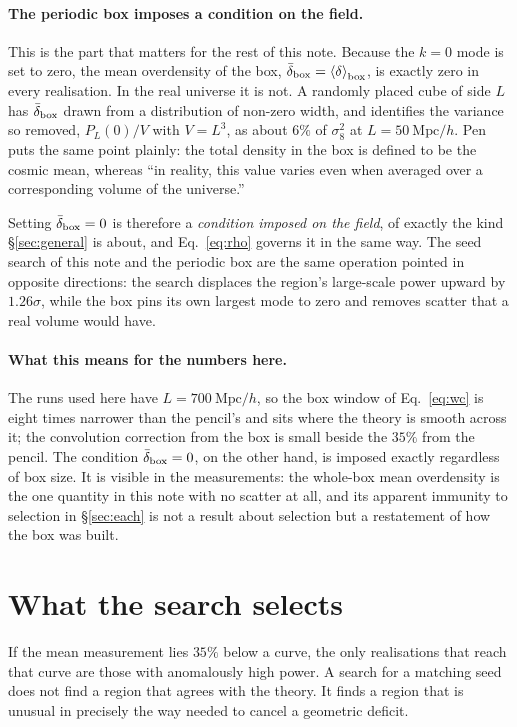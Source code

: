 \documentclass[12pt]{article}
\newcommand{\avg}[1]{\left\langle #1 \right\rangle}
\newcommand{\Mpch}{\ \mathrm{Mpc}/h}
\begin{document}
\paragraph{The periodic box imposes a condition on the field.}
This is the part that matters for the rest of this note. Because the $k = 0$
mode is set to zero, the mean overdensity of the box,
$\bar\delta_{\rm box} = \avg{\delta}_{\rm box}$, is exactly zero in every
realisation. In the real universe it is not. A randomly placed cube of side $L$
has $\bar\delta_{\rm box}$ drawn from a distribution of non-zero width, and
\citet{Sirko2005} identifies the variance so removed, $P_L(0)/V$ with
$V = L^3$, as about $6\%$ of $\sigma_8^2$ at $L = 50\Mpch$. Pen puts the same
point plainly: the total density in the box is defined to be the cosmic mean,
whereas ``in reality, this value varies even when averaged over a corresponding
volume of the universe.''

Setting $\bar\delta_{\rm box} = 0$ is therefore a \emph{condition imposed on the
field}, of exactly the kind \S\ref{sec:general} is about, and
Eq.~\eqref{eq:rho} governs it in the same way. The seed search of this note and
the periodic box are the same operation pointed in opposite directions: the
search displaces the region's large-scale power upward by $1.26\sigma$, while
the box pins its own largest mode to zero and removes scatter that a real volume
would have.

\paragraph{What this means for the numbers here.}
The runs used here have $L = 700\Mpch$, so the box window of Eq.~\eqref{eq:wc}
is eight times narrower than the pencil's and sits where the theory is smooth
across it; the convolution correction from the box is small beside the $35\%$
from the pencil. The condition $\bar\delta_{\rm box} = 0$, on the other hand, is
imposed exactly regardless of box size. It is visible in the measurements: the
whole-box mean overdensity is the one quantity in this note with no scatter at
all, and its apparent immunity to selection in \S\ref{sec:each} is not a result
about selection but a restatement of how the box was built.

\section{What the search selects}
\label{sec:selects}

If the mean measurement lies $35\%$ below a curve, the only realisations that
reach that curve are those with anomalously high power. A search for a matching
seed does not find a region that agrees with the theory. It finds a region that
is unusual in precisely the way needed to cancel a geometric deficit.
\end{document}
